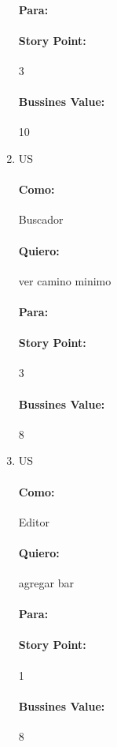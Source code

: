 \begin{enumerate}
\paragraph{Para:}
\paragraph{Story Point:} 3
\paragraph{Bussines Value:} 10

 \item US
 
 
\paragraph{Como:} Buscador
\paragraph{Quiero:} ver camino minimo
\paragraph{Para:}
\paragraph{Story Point:} 3
\paragraph{Bussines Value:} 8 

 \item US
\paragraph{Como:} Editor
\paragraph{Quiero:} agregar bar
\paragraph{Para:}
\paragraph{Story Point:} 1
\paragraph{Bussines Value:} 8



\end{enumerate}
